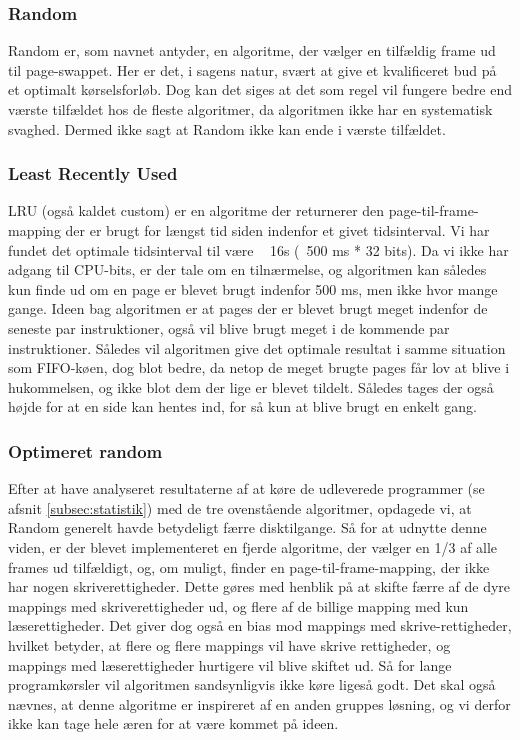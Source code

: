 	\subsubsection{Random}
	Random er, som navnet antyder, en algoritme, der vælger en tilfældig frame ud til page-swappet. Her er det, i sagens natur, svært at give et kvalificeret bud på et optimalt kørselsforløb. Dog kan det siges at det som regel vil fungere bedre end værste tilfældet hos de fleste algoritmer, da algoritmen ikke har en systematisk svaghed. Dermed ikke sagt at Random ikke kan ende i værste tilfældet. 

	\subsubsection{Least Recently Used}
	LRU (også kaldet custom) er en algoritme der returnerer den page-til-frame-mapping der er brugt for længst tid siden indenfor et givet tidsinterval.  Vi har fundet det optimale tidsinterval til være ~ 16s (~500 ms * 32 bits). Da vi ikke har adgang til CPU-bits, er der tale om en tilnærmelse, og algoritmen kan således kun finde ud om en page er blevet brugt indenfor 500 ms, men ikke hvor mange gange. Ideen bag algoritmen er at pages der er blevet brugt meget indenfor de seneste par instruktioner, også vil blive brugt meget i de kommende par instruktioner. Således vil algoritmen give det optimale resultat i samme situation som FIFO-køen, dog blot bedre, da netop de meget brugte pages får lov at blive i hukommelsen, og ikke blot dem der lige er blevet tildelt. Således tages der også højde for at en side kan hentes ind, for så kun at blive brugt en enkelt gang.

	\subsubsection{Optimeret random}
	Efter at have analyseret resultaterne af at køre de udleverede programmer (se afsnit \ref{subsec:statistik}) med de tre ovenstående algoritmer, opdagede vi, at Random generelt havde betydeligt færre disktilgange. Så for at udnytte denne viden, er der blevet implementeret en fjerde algoritme, der vælger en 1/3 af alle frames ud tilfældigt, og, om muligt, finder en page-til-frame-mapping, der ikke har nogen skriverettigheder. Dette gøres med henblik på at skifte færre af de dyre mappings med skriverettigheder ud, og flere af de billige mapping med kun læserettigheder. Det giver dog også en bias mod mappings med skrive-rettigheder, hvilket betyder, at flere og flere mappings vil have skrive rettigheder, og mappings med læserettigheder hurtigere vil blive skiftet ud. Så for lange programkørsler vil algoritmen sandsynligvis ikke køre ligeså godt. Det skal også nævnes, at denne algoritme er inspireret af en anden gruppes løsning, og vi derfor ikke kan tage hele æren for at være kommet på ideen.
